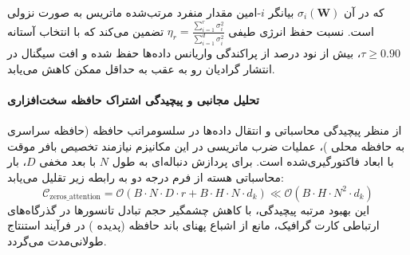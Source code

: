 که در آن $\sigma_i(\mathbf{W})$ بیانگر $i$-امین مقدار منفرد مرتب‌شده ماتریس به صورت نزولی است. نسبت حفظ انرژی طیفی $\eta_r = \frac{\sum_{i=1}^r \sigma_i^2}{\sum_{i=1}^{d} \sigma_i^2}$ تضمین می‌کند که با انتخاب آستانه $\tau \ge 0.90$، بیش از نود درصد از پراکندگی واریانس داده‌ها حفظ شده و افت سیگنال در انتشار گرادیان رو به عقب به حداقل ممکن کاهش می‌یابد.

\paragraph{تحلیل مجانبی و پیچیدگی اشتراک حافظه سخت‌افزاری}
از منظر پیچیدگی محاسباتی و انتقال داده‌ها در سلسومراتب حافظه (حافظه سراسری  به حافظه محلی )، عملیات ضرب ماتریسی در این مکانیزم نیازمند تخصیص بافر موقت با ابعاد فاکتورگیری‌شده است. برای پردازش دنباله‌ای به طول $N$ با بعد مخفی $D$، بار محاسباتی هسته از فرم درجه دو به رابطه زیر تقلیل می‌یابد:
\begin{equation}
\label{eq:complexity_zeros_attention}
\mathcal{C}_{\text{zeros\_attention}} = \mathcal{O}\left( B \cdot N \cdot D \cdot r + B \cdot H \cdot N \cdot d_k \right) \ll \mathcal{O}\left( B \cdot H \cdot N^2 \cdot d_k \right)
\end{equation}
این بهبود مرتبه پیچیدگی، با کاهش چشمگیر حجم تبادل تانسورها در گذرگاه‌های ارتباطی کارت گرافیک، مانع از اشباع پهنای باند حافظه (پدیده ) در فرآیند استنتاج طولانی‌مدت می‌گردد.
